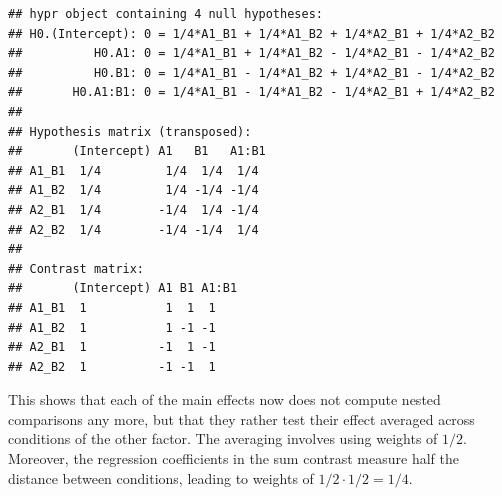 \documentclass[12pt,]{krantz}
\newenvironment{Shaded}{\begin{snugshade}}{\end{snugshade}}
\newcommand{\CommentTok}[1]{\textcolor[rgb]{0.56,0.35,0.01}{\textit{#1}}}
\newcommand{\DecValTok}[1]{\textcolor[rgb]{0.00,0.00,0.81}{#1}}
\newcommand{\KeywordTok}[1]{\textcolor[rgb]{0.13,0.29,0.53}{\textbf{#1}}}
\newcommand{\NormalTok}[1]{#1}
\newcommand{\OperatorTok}[1]{\textcolor[rgb]{0.81,0.36,0.00}{\textbf{#1}}}
\newcommand{\StringTok}[1]{\textcolor[rgb]{0.31,0.60,0.02}{#1}}
\begin{document}
\begin{Shaded}
\end{Shaded}

\begin{verbatim}
## hypr object containing 4 null hypotheses:
## H0.(Intercept): 0 = 1/4*A1_B1 + 1/4*A1_B2 + 1/4*A2_B1 + 1/4*A2_B2
##          H0.A1: 0 = 1/4*A1_B1 + 1/4*A1_B2 - 1/4*A2_B1 - 1/4*A2_B2
##          H0.B1: 0 = 1/4*A1_B1 - 1/4*A1_B2 + 1/4*A2_B1 - 1/4*A2_B2
##       H0.A1:B1: 0 = 1/4*A1_B1 - 1/4*A1_B2 - 1/4*A2_B1 + 1/4*A2_B2
## 
## Hypothesis matrix (transposed):
##       (Intercept) A1   B1   A1:B1
## A1_B1  1/4         1/4  1/4  1/4 
## A1_B2  1/4         1/4 -1/4 -1/4 
## A2_B1  1/4        -1/4  1/4 -1/4 
## A2_B2  1/4        -1/4 -1/4  1/4 
## 
## Contrast matrix:
##       (Intercept) A1 B1 A1:B1
## A1_B1  1           1  1  1   
## A1_B2  1           1 -1 -1   
## A2_B1  1          -1  1 -1   
## A2_B2  1          -1 -1  1
\end{verbatim}

This shows that each of the main effects now does not compute nested comparisons any more, but that they rather test their effect averaged across conditions of the other factor. The averaging involves using weights of \(1/2\). Moreover, the regression coefficients in the sum contrast measure half the distance between conditions, leading to weights of \(1/2 \cdot 1/2 = 1/4\).
\end{document}

